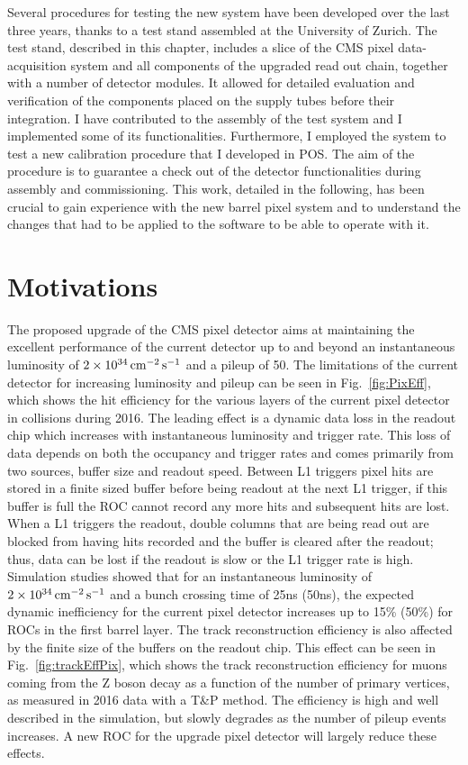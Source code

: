 Several procedures for testing the new system have been developed over the last three years, thanks to a test stand assembled at the University of Zurich. The test stand, described in this chapter, includes a slice of the CMS pixel data-acquisition system and all components of the upgraded read out chain, together with a number of detector modules. It allowed for detailed evaluation and verification of the components placed on the supply tubes before their integration.
I have contributed to the assembly of the test system and I implemented some of its functionalities. Furthermore, I employed the system to test a new calibration procedure that I developed in POS. The aim of the procedure is to guarantee a check out of the detector functionalities during assembly and commissioning. This work, detailed in the following, has been crucial to gain experience with the new barrel pixel system and to understand the changes that had to be applied to the software to be able to operate with it.

\section{Motivations}

The proposed upgrade of the CMS pixel detector aims at maintaining the excellent performance of the current detector up to and beyond an instantaneous luminosity of $2\times10^{34}\,\text{cm}^\text{$-$2}\,\text{s}^\text{$-$1}$ and a pileup of 50.
The limitations of the current detector for increasing luminosity and pileup can be seen in Fig.~\ref{fig:PixEff}, which shows the hit efficiency for the various layers of the current pixel detector in collisions during 2016.
The leading effect is a dynamic data loss in the readout chip which increases with instantaneous luminosity and trigger rate. This loss of data depends on both the occupancy and trigger rates and comes primarily from two sources, buffer size and readout speed. Between L1 triggers pixel hits are stored in a finite sized buffer before being readout at the next L1 trigger, if this buffer is full the ROC cannot record any more hits and subsequent hits are lost. When a L1 triggers the readout, double columns that are being read out are blocked from having hits recorded and the buffer is cleared after the readout; thus, data can be lost if the readout is slow or the L1 trigger rate is high.
Simulation studies showed that for an instantaneous luminosity of $2\times10^{34}\,\text{cm}^\text{$-$2}\,\text{s}^\text{$-$1}$ and a bunch crossing time of 25\unit{ns} (50\unit{ns}),
the expected dynamic inefficiency for the current pixel detector increases up to 15\% (50\%) for ROCs in the first barrel layer.
The track reconstruction efficiency is also affected by the finite size of the buffers on the readout chip. This effect can be seen in Fig.~\ref{fig:trackEffPix}, which shows the track reconstruction efficiency for muons coming from the Z boson decay as a function of the number of primary vertices, as measured in 2016 data with a T\&P method. The efficiency is high and well described in the simulation, but slowly degrades as the number of pileup events increases.
A new ROC for the upgrade pixel detector will largely reduce these effects.\\

